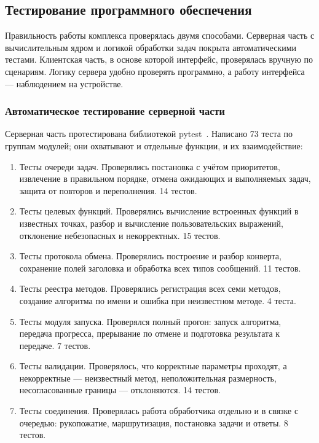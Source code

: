 \documentclass[14pt, a4paper]{extarticle}
\begin{document}
\subsection{Тестирование программного обеспечения}
\label{subsec:testing}

Правильность работы комплекса проверялась двумя способами. Серверная часть с
вычислительным ядром и логикой обработки задач покрыта автоматическими тестами.
Клиентская часть, в основе которой интерфейс, проверялась вручную по сценариям.
Логику сервера удобно проверять программно, а работу интерфейса --- наблюдением на
устройстве.

\subsubsection{Автоматическое тестирование серверной части}

Серверная часть протестирована библиотекой pytest~\cite{pytest_docs}. Написано 73
теста по группам модулей; они охватывают и отдельные функции, и их взаимодействие:

\begin{enumerate}
  \item Тесты очереди задач. Проверялись постановка с учётом приоритетов,
  извлечение в правильном порядке, отмена ожидающих и выполняемых задач, защита от
  повторов и переполнения. 14 тестов.

  \item Тесты целевых функций. Проверялись вычисление встроенных функций в
  известных точках, разбор и вычисление пользовательских выражений, отклонение
  небезопасных и некорректных. 15 тестов.

  \item Тесты протокола обмена. Проверялись построение и разбор конверта,
  сохранение полей заголовка и обработка всех типов сообщений. 11 тестов.

  \item Тесты реестра методов. Проверялись регистрация всех семи методов, создание
  алгоритма по имени и ошибка при неизвестном методе. 4 теста.

  \item Тесты модуля запуска. Проверялся полный прогон: запуск алгоритма, передача
  прогресса, прерывание по отмене и подготовка результата к передаче. 7 тестов.

  \item Тесты валидации. Проверялось, что корректные параметры проходят, а
  некорректные --- неизвестный метод, неположительная размерность, несогласованные
  границы --- отклоняются. 14 тестов.

  \item Тесты соединения. Проверялась работа обработчика отдельно и в связке с
  очередью: рукопожатие, маршрутизация, постановка задачи и ответы. 8 тестов.
\end{enumerate}
\end{document}
